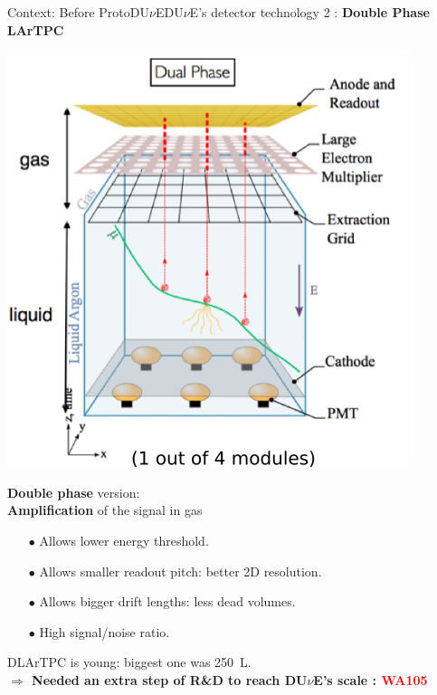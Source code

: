 \documentclass[10pt]{beamer}
\begin{document}
    \begin{frame}{Context: Before \texorpdfstring{ProtoDU$\nu$E}{ProtoDUNE}}{DU$\nu$E's detector technology 2 : \textbf{Double Phase LArTPC}}
    	\begin{scriptsize}
    		\begin{minipage}{0.48\textwidth}
    			\includegraphics[width=\textwidth]{figures/contexte/dlartpc.png}\\
    		\end{minipage}
    		\hfill
    		\begin{minipage}{0.48\textwidth}
    			\textbf{Double phase} version: \\\textbf{Amplification} of the signal in gas
    			\begin{itemize}
    				\item[$\bullet$] Allows lower energy threshold.
    				\item[$\bullet$] Allows smaller readout pitch: better 2D resolution.
    				\item[$\bullet$] Allows bigger drift lengths: less dead volumes.
    				\item[$\bullet$] High signal/noise ratio.
    			\end{itemize}    			
    		\end{minipage}
    	\end{scriptsize}
    	\centering
    	DLArTPC is young: biggest one was \SI{250}{\liter}.\\
    	\textbf{$\Rightarrow$ Needed an extra step of R\&D to reach DU$\nu$E's scale : \textcolor{red}{WA105}}
    \end{frame}
    
\end{document}
